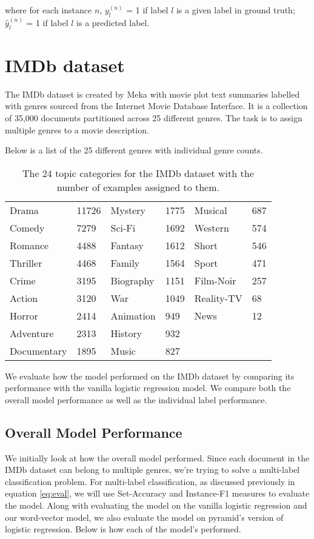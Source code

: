 \noindent where for each instance $n$, $y^{(n)}_{l}$ = 1 if label $l$ is a given label in ground truth; \\
$\hat{y}^{(n)}_{l}$ = 1 if label $l$ is a predicted label.

\section{IMDb dataset}

The IMDb dataset is created by Meka with movie plot text summaries labelled with genres sourced from the Internet Movie Database Interface. It is a collection of 35,000 documents partitioned across 25 different genres. The task is to assign multiple genres to a movie description.

Below is a list of the 25 different genres with individual genre counts.

\begin{table}[htbp]
\centering
\begin{tabular}{ll|ll|ll}
Drama & 11726 & Mystery & 1775 & Musical & 687 \\
Comedy & 7279 & Sci-Fi & 1692 & Western & 574 \\
Romance & 4488 & Fantasy & 1612 & Short & 546 \\
Thriller & 4468 & Family & 1564 & Sport & 471 \\
Crime & 3195 & Biography & 1151 & Film-Noir & 257 \\
Action & 3120 & War & 1049 & Reality-TV & 68 \\
Horror & 2414 & Animation & 949 & News & 12 \\
Adventure & 2313 & History & 932 &  &  \\
Documentary & 1895 & Music & 827 &  & 
\end{tabular}
\caption{\label{tab:widgets}The 24 topic categories for the IMDb dataset with the number of examples assigned to them.}
\end{table}

We evaluate how the model performed on the IMDb dataset by comparing its performance with the vanilla logistic regression model. We compare both the overall model performance as well as the individual label performance.

\subsection{Overall Model Performance}

We initially look at how the overall model performed. Since each document in the IMDb dataset can belong to multiple genres, we're trying to solve a multi-label classification problem. For multi-label classification, as discussed previously in equation \ref{eq:eval}, we will use Set-Accuracy and Instance-F1 measures to evaluate the model. Along with evaluating the model on the vanilla logistic regression and our word-vector model, we also evaluate the model on pyramid's version of logistic regression. Below is how each of the model's performed.

